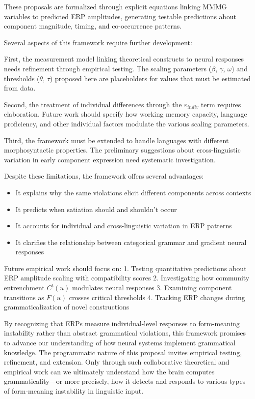 \documentclass[12pt,letterpaper]{article}
\begin{document}
These proposals are formalized through explicit equations linking MMMG variables to predicted ERP amplitudes, generating testable predictions about component magnitude, timing, and co-occurrence patterns.

Several aspects of this framework require further development:

First, the measurement model linking theoretical constructs to neural responses needs refinement through empirical testing. The scaling parameters ($\beta$, $\gamma$, $\omega$) and thresholds ($\theta$, $\tau$) proposed here are placeholders for values that must be estimated from data.

Second, the treatment of individual differences through the $\varepsilon_{indiv}$ term requires elaboration. Future work should specify how working memory capacity, language proficiency, and other individual factors modulate the various scaling parameters.

Third, the framework must be extended to handle languages with different morphosyntactic properties. The preliminary suggestions about cross-linguistic variation in early component expression need systematic investigation.

Despite these limitations, the framework offers several advantages:
\begin{itemize}
    \item It explains why the same violations elicit different components across contexts
    \item It predicts when satiation should and shouldn't occur
    \item It accounts for individual and cross-linguistic variation in ERP patterns
    \item It clarifies the relationship between categorical grammar and gradient neural responses
\end{itemize}

Future empirical work should focus on:
1. Testing quantitative predictions about ERP amplitude scaling with compatibility scores
2. Investigating how community entrenchment $C^t(u)$ modulates neural responses
3. Examining component transitions as $F(u)$ crosses critical thresholds
4. Tracking ERP changes during grammaticalization of novel constructions

By recognizing that ERPs measure individual-level responses to form-meaning instability rather than abstract grammatical violations, this framework promises to advance our understanding of how neural systems implement grammatical knowledge. The programmatic nature of this proposal invites empirical testing, refinement, and extension. Only through such collaborative theoretical and empirical work can we ultimately understand how the brain computes grammaticality—or more precisely, how it detects and responds to various types of form-meaning instability in linguistic input.

\newpage
\begin{sloppypar}
\printbibliography[title=References]
\end{sloppypar}
\end{document}

